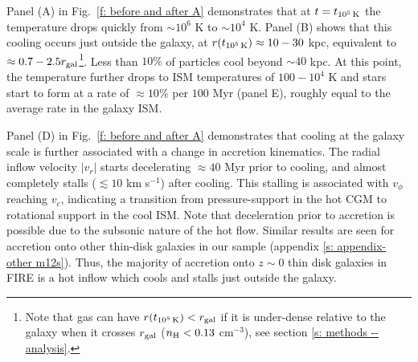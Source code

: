 \documentclass[fleqn,usenatbib]{mnras}
\newcommand{\Rcon}{R_{T=10^5\,{\rm K}}}
\newcommand{\tcon}{t_{10^5\,{\rm K}}}
\begin{document}
Panel (A) in Fig.~\ref{f: before and after A} demonstrates that at $t = \tcon$ the temperature drops quickly from $\sim10^6$ K to $\sim10^4$ K.
Panel (B) shows that this cooling occurs just outside the galaxy, at $r(\tcon) \approx 10-30$ kpc, equivalent to $\approx0.7 - 2.5 r_{\rm gal}$\footnote{Note that gas can have $r(\tcon) < r_{\rm gal}$ if it is under-dense relative to the galaxy when it crosses $r_{\rm gal}$ ($n_{\rm H} < 0.13$ cm$^{-3}$), see section \ref{s: methods -- analysis}.}.
Less than $10\%$ of particles cool beyond $\sim 40$ kpc.
At this point, the temperature further drops to ISM temperatures of $100-10^4$ K and stars start to form at a rate of $\approx10\%$ per $100$ Myr (panel E), roughly equal to the average rate in the galaxy ISM. 

Panel (D) in Fig.~\ref{f: before and after A} demonstrates that cooling at the galaxy scale is further associated with a change in accretion kinematics.
The radial inflow velocity $\vert v_r \vert $ starts decelerating $\approx40$ Myr prior to cooling, and almost completely stalls ($\lesssim10$ km s$^{-1}$) after cooling.
This stalling is associated with $v_\phi$ reaching $v_c$, indicating a transition from pressure-support in the hot CGM to rotational support in the cool ISM.
Note that deceleration prior to accretion is possible due to the subsonic nature of the hot flow.
Similar results are seen for accretion onto other thin-disk galaxies in our sample (appendix \ref{s: appendix-other m12s}).
Thus, the majority of accretion onto $z\sim0$ thin disk galaxies in FIRE is a hot inflow which cools and stalls just outside the galaxy. 


\end{document}

